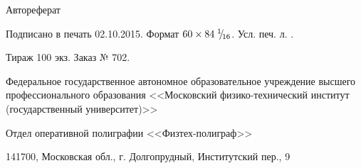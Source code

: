\clearpage

\phantom{top}
\vspace{0pt plus5fill} %
\begin{center}
\thesisAuthor
\end{center}

\vspace{0pt plus1fill}
\begin{center}
\large \thesisTitle
\vspace{0pt plus.5fill}
\large{Автореферат}
\end{center}

\vspace{0pt plus1fill}
\FPeval{}\FPeval{}
\begin{center}
Подписано в печать 02.10.2015. Формат $60 \times 84\; {}^{1}\mkern-5mu/{\!}_{16}$. Усл. печ. л. .

Тираж 100 экз. Заказ № 702.

Федеральное государственное автономное образовательное учреждение высшего профессионального образования
<<Московский физико-технический институт (государственный университет)>>

Отдел оперативной полиграфии <<Физтех-полиграф>>

141700, Московская обл., г. Долгопрудный, Институтский пер., 9
\end{center}

\vspace{0pt plus3fill}
\phantom{bottom}